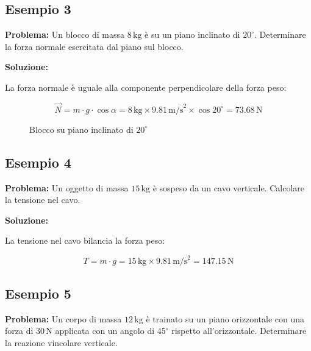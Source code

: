 \documentclass[a4paper,12pt]{article}
\begin{document}
\subsection*{Esempio 3}

\textbf{Problema:} Un blocco di massa $8\,\text{kg}$ è su un piano inclinato di $20^\circ$. Determinare la forza normale esercitata dal piano sul blocco.

\textbf{Soluzione:}

La forza normale è uguale alla componente perpendicolare della forza peso:

\[
\vec{N} = m \cdot g \cdot \cos{\alpha} = 8\,\text{kg} \times 9.81\,\text{m/s}^2 \times \cos{20^\circ} = 73.68\,\text{N}
\]

\begin{figure}[h]
    \centering
    \caption{Blocco su piano inclinato di $20^\circ$}
\end{figure}

\subsection*{Esempio 4}

\textbf{Problema:} Un oggetto di massa $15\,\text{kg}$ è sospeso da un cavo verticale. Calcolare la tensione nel cavo.

\textbf{Soluzione:}

La tensione nel cavo bilancia la forza peso:

\[
T = m \cdot g = 15\,\text{kg} \times 9.81\,\text{m/s}^2 = 147.15\,\text{N}
\]

\subsection*{Esempio 5}

\textbf{Problema:} Un corpo di massa $12\,\text{kg}$ è trainato su un piano orizzontale con una forza di $30\,\text{N}$ applicata con un angolo di $45^\circ$ rispetto all'orizzontale. Determinare la reazione vincolare verticale.
\end{document}
